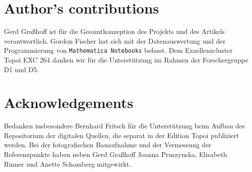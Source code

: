 \documentclass[twocolumn]{bmcart}
\begin{document}
%

\begin{backmatter}
	
	
	\section*{Author's contributions}
	 Gerd Graßhoff ist für die Gesamtkonzeption des Projekts und des Artikels verantwortlich. Gordon Fischer hat sich  mit der Datenauswertung und der Programmierung von  \texttt{Mathematica Notebooks} befasst.  Dem Exzellenzcluster Topoi EXC 264 danken wir für die Unterstützung im Rahmen der Forschergruppe D1 und D5.
	\section*{Acknowledgements}
	
	
	Bedanken insbesondere Bernhard Fritsch für die Unterstützung beim Aufbau des Repositorium der digitalen Quellen, die separat in der Edition Topoi publiziert werden.  Bei der fotografischen Bauaufnahme und der Vermessung der Referenzpunkte haben neben Gerd Graßhoff
	Joanna Pruszynska, Elisabeth Rinner und Anette Schomberg mitgewirkt.
	
	
	
	
	
\end{backmatter}
\end{document}
